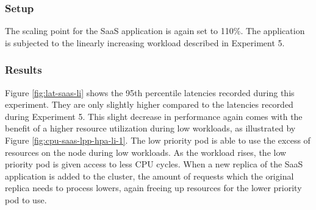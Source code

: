 \subsubsection{Setup}
The scaling point for the SaaS application is again set to 110\%. The application is subjected to the linearly increasing workload described in Experiment 5.


\subsubsection{Results}
Figure \ref{fig:lat-saas-li} shows the 95th percentile latencies recorded during this experiment. They are only slightly higher compared to the latencies recorded during Experiment 5. This slight decrease in performance again comes with the benefit of a higher resource utilization during low workloads, as illustrated by Figure \ref{fig:cpu-saas-lpp-hpa-li-1}. The low priority pod is able to use the excess of resources on the node during low workloads. As the workload rises, the low priority pod is given access to less CPU cycles. When a new replica of the SaaS application is added to the cluster, the amount of requests which the original replica needs to process lowers, again freeing up resources for the lower priority pod to use. 

